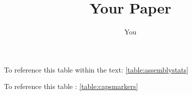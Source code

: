 \documentclass[a4paper]{article}
\title{Your Paper}
\author{You}
\begin{document}
\lipsum[1]


To reference this table within the text: \ref{table:assemblystats}


\lipsum[2]


To reference this table : \ref{table:capsmarkers}	



\end{document}

